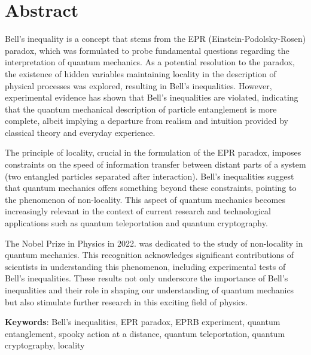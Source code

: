 \chapter*{Abstract}

Bell's inequality is a concept that stems from the EPR (Einstein-Podolsky-Rosen) paradox, which was formulated to probe fundamental questions regarding the interpretation of quantum mechanics. As a potential resolution to the paradox, the existence of hidden variables maintaining locality in the description of physical processes was explored, resulting in Bell's inequalities. However, experimental evidence has shown that Bell's inequalities are violated, indicating that the quantum mechanical description of particle entanglement is more complete, albeit implying a departure from realism and intuition provided by classical theory and everyday experience.

The principle of locality, crucial in the formulation of the EPR paradox, imposes constraints on the speed of information transfer between distant parts of a system (two entangled particles separated after interaction). Bell's inequalities suggest that quantum mechanics offers something beyond these constraints, pointing to the phenomenon of non-locality. This aspect of quantum mechanics becomes increasingly relevant in the context of current research and technological applications such as quantum teleportation and quantum cryptography.

The Nobel Prize in Physics in 2022. was dedicated to the study of non-locality in quantum mechanics. This recognition acknowledges significant contributions of scientists in understanding this phenomenon, including experimental tests of Bell's inequalities. These results not only underscore the importance of Bell's inequalities and their role in shaping our understanding of quantum mechanics but also stimulate further research in this exciting field of physics.



{\textbf{Keywords}}: Bell's inequalities, EPR paradox, EPRB experiment, quantum entanglement, spooky action at a distance, quantum teleportation, quantum cryptography, locality